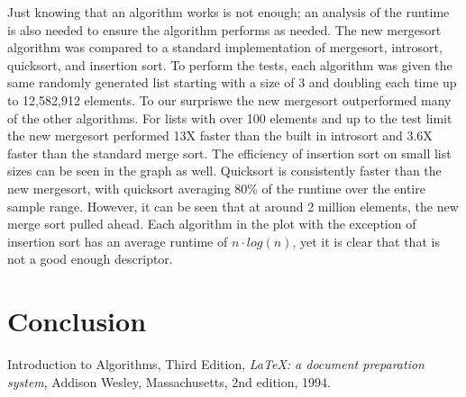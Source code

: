 \documentclass[12pt]{article}
\begin{document}
	Just knowing that an algorithm works is not enough; an analysis of the runtime is also needed to ensure the algorithm performs as needed. 
	The new mergesort algorithm was compared to a standard implementation of mergesort, introsort, quicksort, and insertion sort. 
	To perform the tests, each algorithm was given the same randomly generated list starting with a size of 3 and doubling each time up to 12,582,912 elements. 
	To our surpriswe the new mergesort outperformed many of the other algorithms. 
	For lists with over 100 elements and up to the test limit the new mergesort performed 13X faster than the built in introsort and 3.6X faster than the standard merge sort. 
	The efficiency of insertion sort on small list sizes can be seen in the graph as well. Quicksort is consistently faster than the new mergesort, with quicksort averaging 80\% of the runtime over the entire sample range. 
	However, it can be seen that at around 2 million elements, the new merge sort pulled ahead. 
	Each algorithm in the plot with the exception of insertion sort has an average runtime of $ n \cdot log (n) $, yet it is clear that that is not a good enough descriptor.

	\begin{figure}

	\end{figure}
	
\section{Conclusion}

\pagebreak


\begin{thebibliography}{9}
	Introduction to Algorithms, Third Edition,
	\emph{\LaTeX: a document preparation system},
	Addison Wesley, Massachusetts,
	2nd edition,
	1994.
	
\end{thebibliography}
\end{document}
